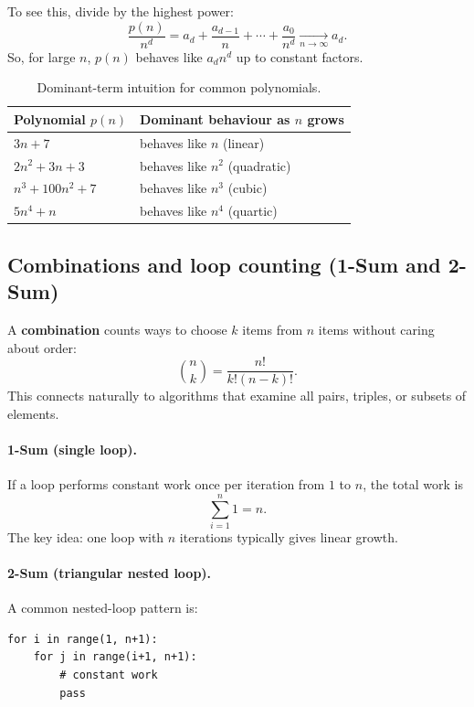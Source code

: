 \documentclass[12pt]{scrartcl}
\begin{document}
To see this, divide by the highest power:
\[
	\frac{p(n)}{n^d}=a_d+\frac{a_{d-1}}{n}+\cdots+\frac{a_0}{n^d}\xrightarrow[n\to\infty]{}a_d.
\]
So, for large \(n\), \(p(n)\) behaves like \(a_dn^d\) up to constant factors.

\begin{table}[h]
	\centering
	\caption{Dominant-term intuition for common polynomials.}
	\begin{tabular}{@{}>{\raggedright}p{} >{\raggedright}p{}@{}}
		\toprule
		Polynomial \(p(n)\) & Dominant behaviour as \(n\) grows \\ \midrule
		\(3n+7\)            & behaves like \(n\) (linear)       \\
		\(2n^2+3n+3\)       & behaves like \(n^2\) (quadratic)  \\
		\(n^3+100n^2+7\)    & behaves like \(n^3\) (cubic)      \\
		\(5n^4 + n\)        & behaves like \(n^4\) (quartic)    \\
		\bottomrule
	\end{tabular}
\end{table}

\subsection{Combinations and loop counting (1-Sum and 2-Sum)}
A \textbf{combination} counts ways to choose \(k\) items from \(n\) items without caring about order:
\[
	\binom{n}{k}=\frac{n!}{k!(n-k)!}.
\]
This connects naturally to algorithms that examine all pairs, triples, or subsets of elements.

\paragraph{1-Sum (single loop).}
If a loop performs constant work once per iteration from \(1\) to \(n\), the total work is
\[
	\sum_{i=1}^{n} 1 = n.
\]
The key idea: one loop with \(n\) iterations typically gives linear growth.

\paragraph{2-Sum (triangular nested loop).}
A common nested-loop pattern is:
\begin{lstlisting}
for i in range(1, n+1):
    for j in range(i+1, n+1):
        # constant work
        pass
\end{lstlisting}
\end{document}
